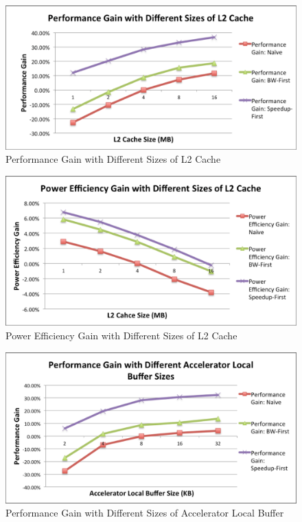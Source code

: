 \begin{figure}
    \centering
    \includegraphics[width=4.5in]{L2-Cache-Performance}
    \caption{Performance Gain with Different Sizes of L2 Cache}
    \label{fig_l2_perf}
\end{figure}

\begin{figure}
    \centering
    \includegraphics[width=4.5in]{L2-Cache-Power}
    \caption{Power Efficiency Gain with Different Sizes of L2 Cache}
    \label{fig_l2_power}
\end{figure}

\begin{figure}
    \centering
    \includegraphics[width=4.5in]{Acc-Buffer-Performance}
    \caption{Performance Gain with Different Sizes of Accelerator Local Buffer}
    \label{fig_acc_buffer_perf}
\end{figure}

